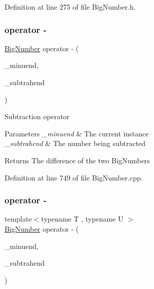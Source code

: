 Definition at line 275 of file Big\+Number.\+h.

\mbox{\label{class_big_nums_1_1_big_number_a9a4cb9889d9180fb6bc9bfdb1de1e8b9}} 
\subsubsection{\texorpdfstring{operator -\/}{operator -}\hspace{0.1cm}{\footnotesize\ttfamily [1/3]}}
{\footnotesize\ttfamily \mbox{\hyperlink{class_big_nums_1_1_big_number}{Big\+Number}} operator -\/ (\begin{DoxyParamCaption}\item[{\mbox{\hyperlink{class_big_nums_1_1_big_number}{Big\+Number}}}]{\+\_\+minuend,  }\item[{const \mbox{\hyperlink{class_big_nums_1_1_big_number}{Big\+Number}} \&}]{\+\_\+subtrahend }\end{DoxyParamCaption})\hspace{0.3cm}{\ttfamily [friend]}}

Subtraction operator 
\begin{DoxyParams}{Parameters}
{\em \+\_\+minuend} & The current instance \\
\hline
{\em \+\_\+subtrahend} & The number being subtracted \\
\hline
\end{DoxyParams}
\begin{DoxyReturn}{Returns}
The difference of the two Big\+Numbers 
\end{DoxyReturn}


Definition at line 749 of file Big\+Number.\+cpp.

\mbox{\label{class_big_nums_1_1_big_number_abafc9bc65d3cf2b1a87fe226d37b107c}} 
\subsubsection{\texorpdfstring{operator -\/}{operator -}\hspace{0.1cm}{\footnotesize\ttfamily [2/3]}}
{\footnotesize\ttfamily template$<$typename T , typename U $>$ \\
\mbox{\hyperlink{class_big_nums_1_1_big_number}{Big\+Number}} operator -\/ (\begin{DoxyParamCaption}\item[{const T \&}]{\+\_\+minuend,  }\item[{const U \&}]{\+\_\+subtrahend }\end{DoxyParamCaption})\hspace{0.3cm}{\ttfamily [friend]}}



